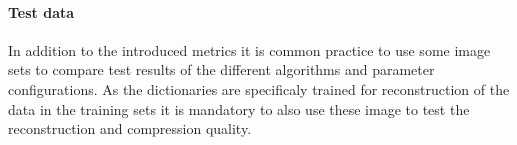 \paragraph{Test data}
In addition to the introduced metrics it is common practice to use some image
sets to compare test results of the different algorithms and parameter
configurations. As the dictionaries are specificaly trained for
reconstruction of the data in the training sets it is mandatory to also use
these image to test the reconstruction and compression quality.
\begin{figure}[h]
\centering
{}
\hspace{5mm}
\hspace{5mm}
\hspace{5mm}
\hspace{5mm}

\end{figure}
